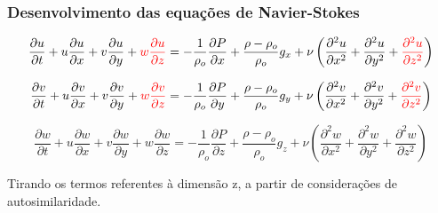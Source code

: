 \documentclass[xcolor=dvipsnames,10pt,aspectratio=169]{beamer}
\begin{document}
	\begin{frame}
		\frametitle{Desenvolvimento das equações de Navier-Stokes}
		\centering
		\begin{equation}
			\frac{\partial u}{\partial t} + u\frac{\partial u}{\partial x} + v\frac{\partial u}{\partial y} + {\color{red} w\frac{\partial u }{\partial z} } =  -\frac{1}{\rho_o} \frac{\partial P}{\partial x} + \frac{\rho - \rho_o}{\rho_o} g_x + \nu \left( \frac{\partial ^2 u}{\partial x^2} + \frac{\partial ^2 u}{\partial y^2} + { \color{red} \frac{\partial ^2 u}{\partial z^2} } \right)
		\end{equation}
	
		\begin{equation}
			\frac{\partial v}{\partial t} + u\frac{\partial v}{\partial x} + v\frac{\partial v}{\partial y} + {\color{red} w\frac{\partial v }{\partial z} } =  -\frac{1}{\rho_o} \frac{\partial P}{\partial y} + \frac{\rho - \rho_o}{\rho_o} g_y + \nu \left( \frac{\partial ^2 v}{\partial x^2} + \frac{\partial ^2 v}{\partial y^2} + { \color{red} \frac{\partial ^2 v}{\partial z^2} } \right)
		\end{equation}
		
		{\color{red}
			\begin{equation}
				\frac{\partial w}{\partial t} + u\frac{\partial w}{\partial x} + v\frac{\partial w}{\partial y} + w\frac{\partial w }{\partial z}  =  -\frac{1}{\rho_o} \frac{\partial P}{\partial z} + \frac{\rho - \rho_o}{\rho_o} g_z + \nu \left( \frac{\partial ^2 w}{\partial x^2} + \frac{\partial ^2 w}{\partial y^2} + \frac{\partial ^2 w}{\partial z^2} \right)
			\end{equation}
		}
		
		Tirando os termos referentes à dimensão z, a partir de considerações de autosimilaridade.
		
		
	\end{frame}
\end{document}
